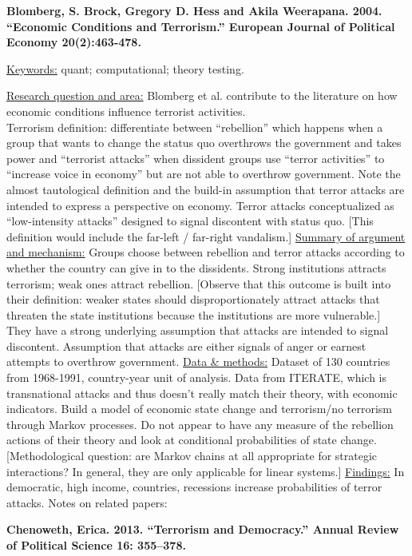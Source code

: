 \documentclass{article}[12pt]
\begin{document}
\textbf{Blomberg, S. Brock, Gregory D. Hess and Akila Weerapana. 2004. “Economic Conditions and Terrorism.” European Journal of Political Economy 20(2):463-478.}

\underline{Keywords:} quant; computational; theory testing.

\underline{Research question and area:} Blomberg et al. contribute to the literature on how economic conditions influence terrorist activities.\\
Terrorism definition: differentiate between ``rebellion'' which happens when a group that wants to change the status quo overthrows the government and takes power and ``terrorist attacks'' when dissident groups use ``terror activities'' to ``increase voice in economy'' but are not able to overthrow government. Note the almost tautological definition and the build-in assumption that terror attacks are intended to express a perspective on economy. Terror attacks conceptualized as ``low-intensity attacks'' designed to signal discontent with status quo. [This definition would include the far-left / far-right vandalism.]
\underline{Summary of argument and mechanism:} Groups choose between rebellion and terror attacks according to whether the country can give in to the dissidents. Strong institutions attracts terrorism; weak ones attract rebellion. [Observe that this outcome is built into their definition: weaker states should disproportionately attract attacks that threaten the state institutions because the institutions are more vulnerable.] They have a strong underlying assumption that attacks are intended to signal discontent. Assumption that attacks are either signals of anger or earnest attempts to overthrow government.
\underline{Data \& methods:} Dataset of 130 countries from 1968-1991, country-year unit of analysis. Data from ITERATE, which is transnational attacks and thus doesn't really match their theory, with economic indicators. Build a model of economic state change and terrorism/no terrorism through Markov processes. Do not appear to have any measure of the rebellion actions of their theory and look at conditional probabilities of state change. [Methodological question: are Markov chains at all appropriate for strategic interactions? In general, they are only applicable for linear systems.]
\underline{Findings:} In democratic, high income, countries, recessions increase probabilities of terror attacks. 
Notes on related papers:


\textbf{Chenoweth, Erica. 2013. “Terrorism and Democracy.” Annual Review of Political Science 16: 355–378.}
\end{document}
